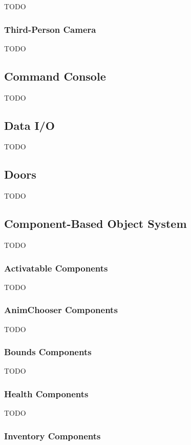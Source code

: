 TODO

\subsubsection{Third-Person Camera}

TODO

\subsection{Command Console}

TODO

\subsection{Data I/O}

TODO

\subsection{Doors}

TODO

\subsection{Component-Based Object System}

TODO

\subsubsection{Activatable Components}

TODO

\subsubsection{AnimChooser Components}

TODO

\subsubsection{Bounds Components}

TODO

\subsubsection{Health Components}

TODO

\subsubsection{Inventory Components}

